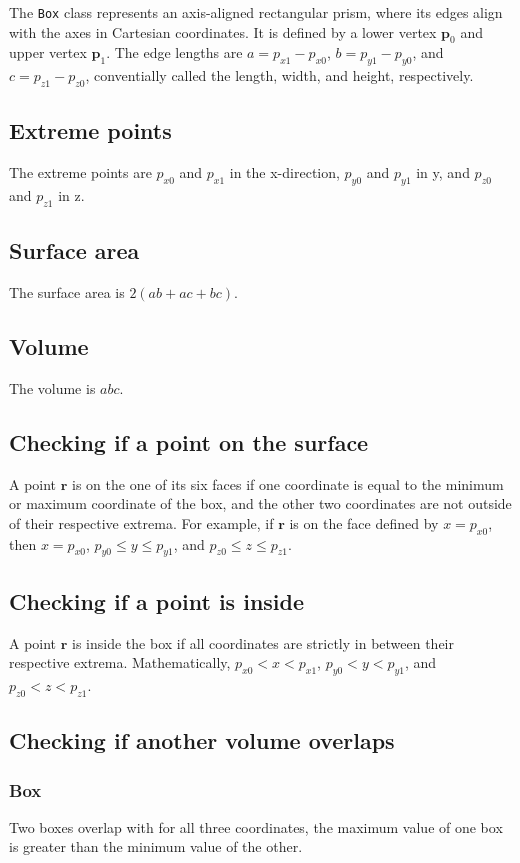The \lstinline|Box| class represents an axis-aligned rectangular prism, where its edges align with the axes in Cartesian coordinates.
It is defined by a lower vertex $\bm{p}_0$ and upper vertex $\bm{p}_1$. The edge lengths are $a = p_{x1} - p_{x0}$, $b = p_{y1} - p_{y0}$, and $c = p_{z1} - p_{z0}$,
conventially called the length, width, and height, respectively.

\subsection{Extreme points}
The extreme points are $p_{x0}$ and $p_{x1}$ in the x-direction, $p_{y0}$ and $p_{y1}$ in y, and $p_{z0}$ and $p_{z1}$ in z.

\subsection{Surface area}
The surface area is $2(ab + ac + bc)$.

\subsection{Volume}
The volume is $abc$.

\subsection{Checking if a point on the surface}
A point $\bm{r}$ is on the one of its six faces if one coordinate is equal to the minimum or maximum coordinate of the box, and the other two coordinates
are not outside of their respective extrema. For example, if $\bm{r}$ is on the face defined by $x = p_{x0}$, then $x = p_{x0}$, $p_{y0} \leq y \leq p_{y1}$, and $p_{z0} \leq z \leq p_{z1}$.

\subsection{Checking if a point is inside}
A point $\bm{r}$ is inside the box if all coordinates are strictly in between their respective extrema. Mathematically, $p_{x0} < x < p_{x1}$, $p_{y0} < y < p_{y1}$, and $p_{z0} < z < p_{z1}$.

\subsection{Checking if another volume overlaps}
\subsubsection{Box}
Two boxes overlap with for all three coordinates, the maximum value of one box is greater than the minimum value of the other.
